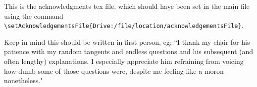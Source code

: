 This is the acknowledgments tex file, which should have been set in the main file using the command \verb|\setAcknowledgementsFile{Drive:/file/location/acknowledgementsFile}|.

Keep in mind this should be written in first person, eg;
``I thank my chair for his patience with my random tangents and endless questions and his subsequent (and often lengthy) explanations. I especially appreciate him refraining from voicing how dumb some of those questions were, despite me feeling like a moron nonetheless."